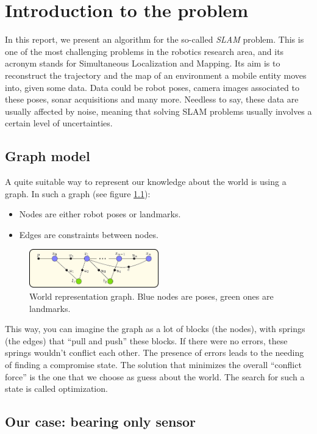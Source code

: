 \chapter{Introduction to the problem}\label{cap:Introduction}
In this report, we present an algorithm for the so-called \textit{SLAM} problem. This is one of the most challenging problems in the robotics research area, and its acronym stands for Simultaneous Localization and Mapping. Its aim is to reconstruct the trajectory and the map of an environment a mobile entity moves into, given some data.
Data could be robot poses, camera images associated to these poses, sonar acquisitions and many more.
Needless to say, these data are usually affected by noise, meaning that solving SLAM problems usually involves a certain level of uncertainties.

\section{Graph model}
A quite suitable way to represent our knowledge about the world is using a graph.
In such a graph (see figure \ref{fig:graph}):
\begin{itemize}
  \item Nodes are either robot poses or landmarks.
  \item Edges are constraints between nodes.
\end{itemize}
\begin{figure}[htbp]
  \centering
    \includegraphics[width=0.5\textwidth]{images/graph.png}
  \caption{World representation graph. Blue nodes are poses, green ones are landmarks.}
  \label{fig:graph}
\end{figure}
This way, you can imagine the graph as a lot of blocks (the nodes), with springs (the edges) that ``pull and push'' these blocks.
If there were no errors, these springs wouldn't conflict each other. The presence of errors leads to the needing of finding a compromise state.
The solution that minimizes the overall ``conflict force'' is the one that we choose as guess about the world. The search for such a state is called optimization.

\section{Our case: bearing only sensor}

